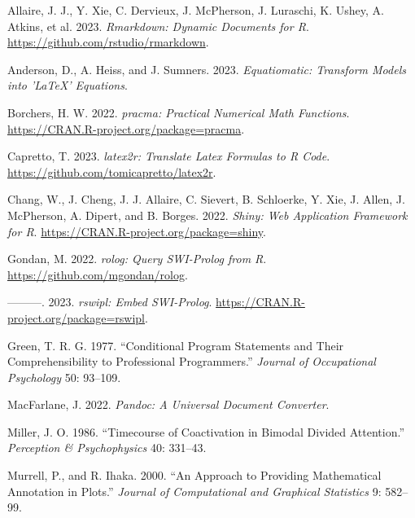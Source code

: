 \hypertarget{refs}{}
\begin{CSLReferences}{1}{0}
\leavevmode{}%
Allaire, J. J., Y. Xie, C. Dervieux, J. McPherson, J. Luraschi, K. Ushey, A. Atkins, et al. 2023. \emph{Rmarkdown: Dynamic Documents for {R}}. \url{https://github.com/rstudio/rmarkdown}.

\leavevmode{}%
Anderson, D., A. Heiss, and J. Sumners. 2023. \emph{Equatiomatic: Transform Models into 'LaTeX' Equations}.

\leavevmode{}%
Borchers, H. W. 2022. \emph{{pracma}: Practical Numerical Math Functions}. \url{https://CRAN.R-project.org/package=pracma}.

\leavevmode{}%
Capretto, T. 2023. \emph{{latex2r}: Translate Latex Formulas to {R} Code}. \url{https://github.com/tomicapretto/latex2r}.

\leavevmode{}%
Chang, W., J. Cheng, J. J. Allaire, C. Sievert, B. Schloerke, Y. Xie, J. Allen, J. McPherson, A. Dipert, and B. Borges. 2022. \emph{Shiny: Web Application Framework for {R}}. \url{https://CRAN.R-project.org/package=shiny}.

\leavevmode{}%
Gondan, M. 2022. \emph{{rolog}: Query {SWI}-{P}rolog from {R}}. \url{https://github.com/mgondan/rolog}.

\leavevmode{}%
---------. 2023. \emph{{rswipl}: Embed {SWI}-{P}rolog}. \url{https://CRAN.R-project.org/package=rswipl}.

\leavevmode{}%
Green, T. R. G. 1977. {``Conditional Program Statements and Their Comprehensibility to Professional Programmers.''} \emph{Journal of Occupational Psychology} 50: 93--109.

\leavevmode{}%
MacFarlane, J. 2022. \emph{Pandoc: A Universal Document Converter}.

\leavevmode{}%
Miller, J. O. 1986. {``Timecourse of Coactivation in Bimodal Divided Attention.''} \emph{Perception \& Psychophysics} 40: 331--43.

\leavevmode{}%
Murrell, P., and R. Ihaka. 2000. {``An Approach to Providing Mathematical Annotation in Plots.''} \emph{Journal of Computational and Graphical Statistics} 9: 582--99.


\end{CSLReferences}
